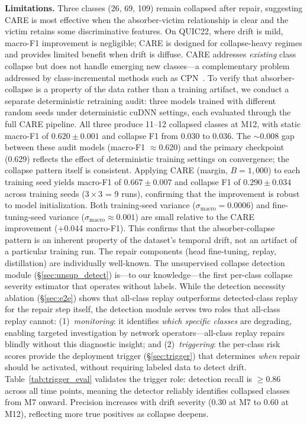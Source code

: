 \documentclass[journal]{IEEEtran}
\newcommand{\ours}{CARE}  %
\begin{document}
\textbf{Limitations.}
Three classes (26, 69, 109) remain collapsed after repair, suggesting \ours{} is most effective when the absorber-victim relationship is clear and the victim retains some discriminative features.
On QUIC22, where drift is mild, macro-F1 improvement is negligible; \ours{} is designed for collapse-heavy regimes and provides limited benefit when drift is diffuse.
\ours{} addresses \textit{existing} class collapse but does not handle emerging new classes---a complementary problem addressed by class-incremental methods such as CPN~\cite{cai2024cpn}.
To verify that absorber-collapse is a property of the data rather than a training artifact, we conduct a separate deterministic retraining audit: three models trained with different random seeds under deterministic cuDNN settings, each evaluated through the full CARE pipeline.
All three produce 11--12 collapsed classes at M12, with static macro-F1 of $0.620{\pm}0.001$ and collapse F1 from 0.030 to 0.036.
The ${\sim}$0.008 gap between these audit models (macro-F1 ${\approx}$0.620) and the primary checkpoint (0.629) reflects the effect of deterministic training settings on convergence; the collapse pattern itself is consistent.
Applying CARE (margin, $B{=}1{,}000$) to each training seed yields macro-F1 of $0.667{\pm}0.007$ and collapse F1 of $0.290{\pm}0.034$ across training seeds ($3{\times}3$ = 9 runs), confirming that the improvement is robust to model initialization.
Both training-seed variance ($\sigma_{\text{macro}}{=}0.0006$) and fine-tuning-seed variance ($\sigma_{\text{macro}}{\approx}0.001$) are small relative to the CARE improvement ($+$0.044 macro-F1). This confirms that the absorber-collapse pattern is an inherent property of the dataset's temporal drift, not an artifact of a particular training run.
The repair components (head fine-tuning, replay, distillation) are individually well-known.
The unsupervised collapse detection module (\S\ref{sec:unsup_detect}) is---to our knowledge---the first per-class collapse severity estimator that operates without labels.
While the detection necessity ablation (\S\ref{sec:e2e}) shows that all-class replay outperforms detected-class replay for the repair step itself, the detection module serves two roles that all-class replay cannot: (1)~\textit{monitoring}: it identifies \textit{which specific classes} are degrading, enabling targeted investigation by network operators---all-class replay repairs blindly without this diagnostic insight; and (2)~\textit{triggering}: the per-class risk scores provide the deployment trigger (\S\ref{sec:trigger}) that determines \textit{when} repair should be activated, without requiring labeled data to detect drift.
Table~\ref{tab:trigger_eval} validates the trigger role: detection recall is $\geq$0.86 across all time points, meaning the detector reliably identifies collapsed classes from M7 onward. Precision increases with drift severity (0.30 at M7 to 0.60 at M12), reflecting more true positives as collapse deepens.
\end{document}
